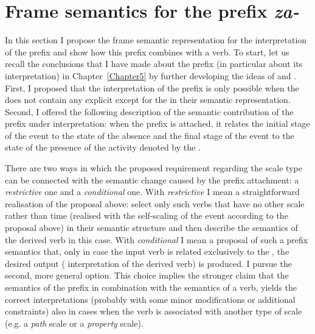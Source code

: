 \section{Frame semantics for the prefix \textit{za-}}\label{section:frame:za}
In this section I propose the frame semantic representation for the  interpretation of the prefix  and show how this prefix combines with a verb. To start, let us recall the conclusions that I have made about the prefix  (in particular about its  interpretation) in Chapter~\ref{Chapter5} by further developing the ideas of \citet{Braginsky:08} and \citet{Kagan:book}. First, I proposed that the  interpretation of the prefix is only possible when the  does not contain any explicit  except for the  in their semantic representation. Second, I offered the following description of the semantic contribution of the prefix  under  interpretation: when the prefix is attached, it relates the initial stage of the event to the state of the absence and the final stage of the event to the state of the presence of the activity denoted by the .

There are two ways in which the proposed requirement regarding the scale type can be connected with the semantic change caused by the prefix attachment: a \textit{restrictive} one and a \textit{conditional} one. With \textit{restrictive} I mean a straightforward realisation of the proposal above: select only such verbs that have no other scale rather than time (realised with the self-scaling of the event according to the proposal above) in their semantic structure and then describe the semantics of the derived verb in this case. With \textit{conditional} I mean a proposal of such a prefix semantics that, only in case the input verb is related exclusively to the , the desired output ( interpretation of the derived verb) is produced. I pursue the second, more general option. This choice implies the stronger claim that the semantics of the prefix in combination with the semantics of a verb, yields the correct interpretations (probably with some minor modifications or additional constraints) also in cases when the verb is associated with another type of scale (e.g. a \textit{path} scale or a \textit{property} scale). 

